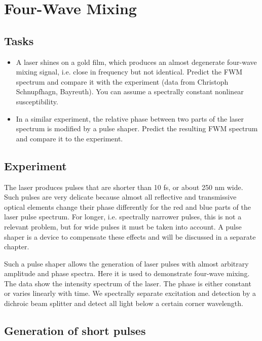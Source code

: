 \renewcommand{\lastmod}{June 20, 2024}
\renewcommand{\chapterauthors}{Markus Lippitz}


\chapter{Four-Wave Mixing}


\section{Tasks}

\begin{itemize}
\item A laser shines on a gold film, which produces an almost degenerate four-wave mixing signal, i.e. close in frequency but not identical. Predict the FWM spectrum and compare it with the experiment (data from Christoph Schnupfhagn, Bayreuth). You can assume a spectrally constant nonlinear susceptibility.

\item In a similar experiment, the relative phase between two parts of the laser spectrum is modified by a pulse shaper. Predict the resulting FWM spectrum and compare it to the experiment.
\end{itemize}

\section{Experiment}

The laser produces pulses that are shorter than 10 fs, or about 250 nm wide. Such pulses are very delicate because almost all reflective and transmissive optical elements change their phase differently for the red and blue parts of the laser pulse spectrum. For longer, i.e. spectrally narrower pulses, this is not a relevant problem, but for wide pulses it must be taken into account. A pulse shaper is a device to compensate these effects and will be discussed in a separate chapter.

Such a pulse shaper allows the generation of laser pulses with almost arbitrary amplitude and phase spectra. Here it is used to demonstrate four-wave mixing. The data show the intensity spectrum of the laser. The phase is either constant or varies linearly with time.
We spectrally separate excitation and detection by a dichroic beam splitter and detect all light below a certain corner wavelength. 


\section{Generation of short pulses}


